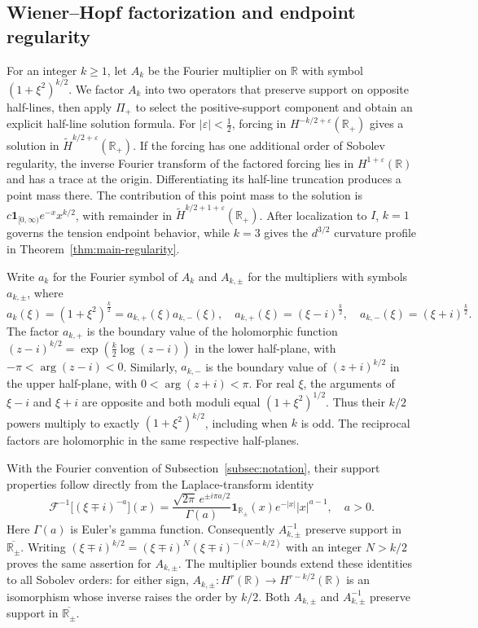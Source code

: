 \documentclass[11pt,reqno]{amsart}
\theoremstyle{plain}
\theoremstyle{definition}
\numberwithin{equation}{section}
\newcommand{\wt}[1]{\widetilde{#1}}
\newcommand{\R}{\mathbb{R}}
\begin{document}
\subsection{Wiener--Hopf factorization and endpoint regularity}
\label{subsec:endpoint-factorization}

For an integer $k\ge1$, let $A_k$ be the Fourier multiplier on $\R$
with symbol $(1+\xi^2)^{k/2}$. We factor $A_k$ into two operators that
preserve support on opposite half-lines, then apply $\Pi_+$ to select the
positive-support component and obtain an explicit half-line solution formula.
For $|\varepsilon|<\frac12$, forcing in
$H^{-k/2+\varepsilon}(\R_+)$ gives a solution in
$\wt H^{k/2+\varepsilon}(\R_+)$.
If the forcing has one additional order of Sobolev regularity, the inverse
Fourier transform of the factored forcing lies in $H^{1+\varepsilon}(\R)$
and has a trace at the origin. Differentiating its
half-line truncation produces a point mass there. The contribution of this
point mass to the solution is $c\mathbf1_{[0,\infty)}e^{-x}x^{k/2}$, with
remainder in $\wt H^{k/2+1+\varepsilon}(\R_+)$.
After localization to $I$, $k=1$ governs the tension endpoint behavior,
while $k=3$ gives the $d^{3/2}$ curvature profile in
Theorem~\ref{thm:main-regularity}.

Write $a_k$ for the Fourier symbol of $A_k$ and $A_{k,\pm}$ for the multipliers
with symbols $a_{k,\pm}$, where
\begin{equation}\label{eqn:orderk-symbol-factorization}
    a_k(\xi)
    =(1+\xi^2)^{\frac{k}{2}}
    =a_{k,+}(\xi)a_{k,-}(\xi),
    \quad
    a_{k,+}(\xi)=(\xi-i)^{\frac{k}{2}},
    \quad
    a_{k,-}(\xi)=(\xi+i)^{\frac{k}{2}}.
\end{equation}
The factor $a_{k,+}$ is the boundary value of the holomorphic function
$(z-i)^{k/2}=\exp(\frac{k}{2}\log(z-i))$ in the lower half-plane, with
$-\pi<\arg(z-i)<0$. Similarly, $a_{k,-}$ is the boundary value of
$(z+i)^{k/2}$ in the upper half-plane, with $0<\arg(z+i)<\pi$.
For real $\xi$, the arguments of $\xi-i$ and $\xi+i$ are opposite and
both moduli equal $(1+\xi^2)^{1/2}$. Thus their $k/2$ powers multiply
to exactly $(1+\xi^2)^{k/2}$, including when $k$ is odd.
The reciprocal factors are holomorphic in the same respective half-planes.

With the Fourier convention of Subsection~\ref{subsec:notation}, their
support properties follow directly from the Laplace-transform identity
\begin{equation}\label{eq:halfline-factor-kernel}
    \mathcal F^{-1}\!\bigl[(\xi\mp i)^{-a}\bigr](x)
    =\frac{\sqrt{2\pi}\,e^{\pm i\pi a/2}}{\Gamma(a)}
    \mathbf1_{\R_\pm}(x)e^{-|x|}|x|^{a-1},
    \quad a>0.
\end{equation}
Here $\Gamma(a)$ is Euler's gamma function.
Consequently $A_{k,\pm}^{-1}$ preserve support in $\overline{\R_\pm}$.
Writing $(\xi\mp i)^{k/2}=(\xi\mp i)^N(\xi\mp i)^{-(N-k/2)}$
with an integer $N>k/2$ proves the same assertion for $A_{k,\pm}$.
The multiplier bounds extend these identities to all Sobolev orders:
for either sign, $A_{k,\pm}:H^r(\R)\to H^{r-k/2}(\R)$ is an isomorphism
whose inverse raises the order by $k/2$. Both $A_{k,\pm}$ and
$A_{k,\pm}^{-1}$ preserve support in $\overline{\R_\pm}$.
\end{document}

